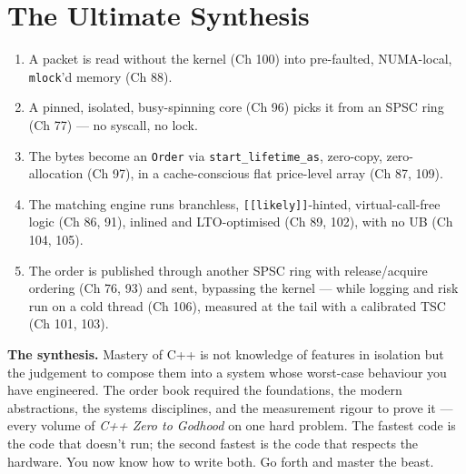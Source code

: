 \section{The Ultimate Synthesis}
\begin{enumerate}
\item A packet is read without the kernel (Ch 100) into pre-faulted, NUMA-local, \texttt{mlock}'d memory (Ch 88).
\item A pinned, isolated, busy-spinning core (Ch 96) picks it from an SPSC ring (Ch 77) --- no syscall, no lock.
\item The bytes become an \texttt{Order} via \texttt{start\_lifetime\_as}, zero-copy, zero-allocation (Ch 97), in a cache-conscious flat price-level array (Ch 87, 109).
\item The matching engine runs branchless, \texttt{[[likely]]}-hinted, virtual-call-free logic (Ch 86, 91), inlined and LTO-optimised (Ch 89, 102), with no UB (Ch 104, 105).
\item The order is published through another SPSC ring with release/acquire ordering (Ch 76, 93) and sent, bypassing the kernel --- while logging and risk run on a cold thread (Ch 106), measured at the tail with a calibrated TSC (Ch 101, 103).
\end{enumerate}

\textbf{The synthesis.} Mastery of C++ is not knowledge of features in isolation but the judgement to compose them into a system whose worst-case behaviour you have engineered. The order book required the foundations, the modern abstractions, the systems disciplines, and the measurement rigour to prove it --- every volume of \emph{C++ Zero to Godhood} on one hard problem. The fastest code is the code that doesn't run; the second fastest is the code that respects the hardware. You now know how to write both. Go forth and master the beast.
